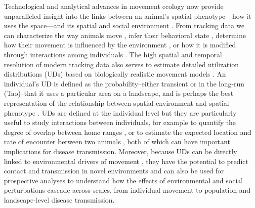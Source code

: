 \documentclass[letterpaper]{article}
\begin{document}
Technological and analytical advances in movement ecology now provide unparalleled insight into the links between an animal's spatial phenotype---how it uses the space---and its spatial and social environment \citep{Webber2023}. 
From tracking data we can characterize the way animals move \citep{Abrahms2017}, infer their behavioral state \citep{Langrock2012}, determine how their movement is influenced by the environment \citep{Avgar2015,Potts2022}, or how it is modified through interactions among individuals \citep{Scharf2016, Scharf2018}. 
The high spatial and temporal resolution of modern tracking data also serves to estimate detailed utilization distributions (UDs) based on biologically realistic movement models \citep{Fleming2014,Gurarie2011,Potts2023}.
An individual's UD is defined as the probability--either transient or in the long-run (Tao)--that it uses a particular area on a landscape, and is perhaps the best representation of the relationship between spatial environment and spatial phenotype \citet{Webber2023}. 
UDs are defined at the individual level but they are particularly useful to study interactions between individuals, for example to quantify the degree of overlap between home ranges \citep{Winner2018}, or to estimate the expected location and  rate of encounter between two animals \citep{Noonan2021}, both of which can have important implications for disease transmission. 
Moreover, because UDs can be directly linked to environmental drivers of movement \citep{Signer2017}, they have the potential to predict contact and transmission in novel environments and can also be used for prospective analyses to understand how the effects of environmental and social perturbations cascade across scales, from individual movement to population and landscape-level disease transmission. 


\end{document}
